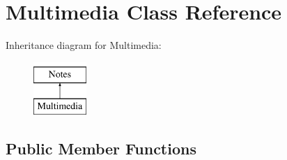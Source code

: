 \hypertarget{class_multimedia}{}\section{Multimedia Class Reference}
\label{class_multimedia}
Inheritance diagram for Multimedia\+:\begin{figure}[H]
\begin{center}
\leavevmode
\includegraphics[height=2.000000cm]{class_multimedia}
\end{center}
\end{figure}
\subsection*{Public Member Functions}
